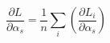 \documentclass[10pt]{article}
\begin{document}
\[\frac{\partial L}{\partial \alpha_s} = \frac{1}{n}\sum_i \left( \frac{\partial L_i}{\partial \alpha_s} \right)
\]
\end{document}
